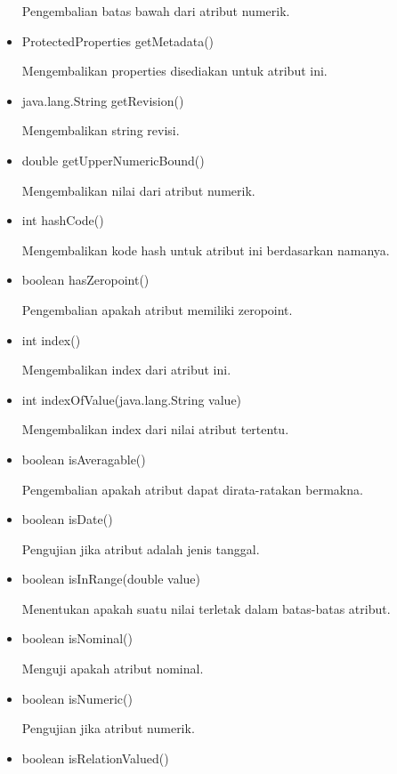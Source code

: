 \begin{itemize}
	Pengembalian batas bawah dari atribut numerik.
	
	\item ProtectedProperties getMetadata()
	
	Mengembalikan properties disediakan untuk atribut ini.
	
	\item java.lang.String getRevision()
	
	Mengembalikan string revisi.
	
	\item double getUpperNumericBound()
	
	Mengembalikan nilai dari atribut numerik.
	
	\item int hashCode()
	
	Mengembalikan kode hash untuk atribut ini berdasarkan namanya.
	
	\item boolean hasZeropoint()
	
	Pengembalian apakah atribut memiliki zeropoint.
	
	\item int index()
	
	Mengembalikan index dari atribut ini.
	
	\item int indexOfValue(java.lang.String value)
	
	Mengembalikan index dari nilai atribut tertentu.
	
	\item boolean isAveragable()
	
	Pengembalian apakah atribut dapat dirata-ratakan bermakna.
	
	\item boolean isDate()
	
	Pengujian jika atribut adalah jenis tanggal.
	
	\item boolean isInRange(double value)
	
	Menentukan apakah suatu nilai terletak dalam batas-batas atribut.
	
	\item boolean isNominal()
	
	Menguji apakah atribut nominal.
	
	\item boolean isNumeric()
	
	Pengujian jika atribut numerik.
	
	\item boolean isRelationValued()
	

\end{itemize}
